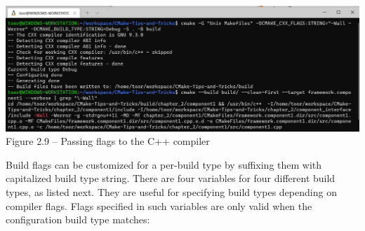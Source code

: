 \begin{center}
\includegraphics[width=1.\textwidth]{content/1/chapter2/images/9.jpg}\\
Figure 2.9 – Passing flags to the C++ compiler
\end{center}

Build flags can be customized for a per-build type by suffixing them with capitalized build type string. There are four variables for four  different build types, as listed next. They are useful for specifying build types depending on compiler flags. Flags specified in such variables are only valid when the configuration build type matches:











